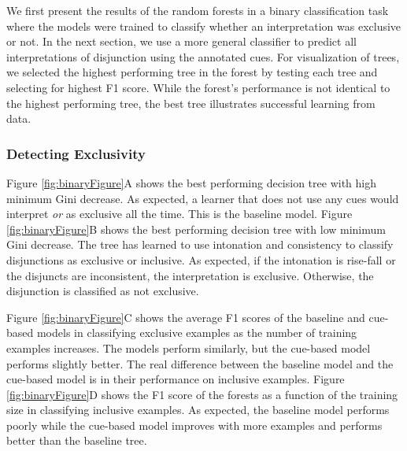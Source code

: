 \documentclass[
  english,
  ,man,floatsintext]{apa6}
\begin{document}
We first present the results of the random forests in a binary classification task where the models were trained to classify whether an interpretation was exclusive or not. In the next section, we use a more general classifier to predict all interpretations of disjunction using the annotated cues. For visualization of trees, we selected the highest performing tree in the forest by testing each tree and selecting for highest F1 score. While the forest's performance is not identical to the highest performing tree, the best tree illustrates successful learning from data.

\hypertarget{detecting-exclusivity}{%
\subsubsection{Detecting Exclusivity}\label{detecting-exclusivity}}

Figure \ref{fig:binaryFigure}A shows the best performing decision tree with high minimum Gini decrease. As expected, a learner that does not use any cues would interpret \emph{or} as exclusive all the time. This is the baseline model. Figure \ref{fig:binaryFigure}B shows the best performing decision tree with low minimum Gini decrease. The tree has learned to use intonation and consistency to classify disjunctions as exclusive or inclusive. As expected, if the intonation is rise-fall or the disjuncts are inconsistent, the interpretation is exclusive. Otherwise, the disjunction is classified as not exclusive.

Figure \ref{fig:binaryFigure}C shows the average F1 scores of the baseline and cue-based models in classifying exclusive examples as the number of training examples increases. The models perform similarly, but the cue-based model performs slightly better. The real difference between the baseline model and the cue-based model is in their performance on inclusive examples. Figure \ref{fig:binaryFigure}D shows the F1 score of the forests as a function of the training size in classifying inclusive examples. As expected, the baseline model performs poorly while the cue-based model improves with more examples and performs better than the baseline tree.
\end{document}
